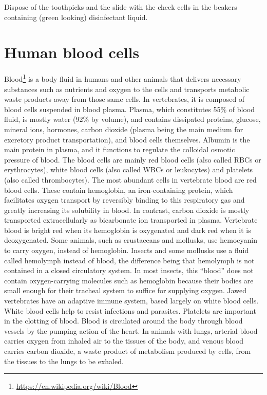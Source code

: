 \documentclass[]{book}
\let\rmarkdownfootnote\footnote%
\def\footnote{\protect\rmarkdownfootnote}
\renewcommand{\href}[2]{#2\footnote{\url{#1}}}
\theoremstyle{definition}
\theoremstyle{definition}
\theoremstyle{definition}
\theoremstyle{remark}
\begin{document}
Dispose of the toothpicks and the slide with the cheek cells in the
beakers containing (green looking) disinfectant liquid.

\section{Human blood cells}\label{human-blood-cells}

\href{https://en.wikipedia.org/wiki/Blood}{Blood} is a body fluid in
humans and other animals that delivers necessary substances such as
nutrients and oxygen to the cells and transports metabolic waste
products away from those same cells. In vertebrates, it is composed of
blood cells suspended in blood plasma. Plasma, which constitutes 55\% of
blood fluid, is mostly water (92\% by volume), and contains dissipated
proteins, glucose, mineral ions, hormones, carbon dioxide (plasma being
the main medium for excretory product transportation), and blood cells
themselves. Albumin is the main protein in plasma, and it functions to
regulate the colloidal osmotic pressure of blood. The blood cells are
mainly red blood cells (also called RBCs or erythrocytes), white blood
cells (also called WBCs or leukocytes) and platelets (also called
thrombocytes). The most abundant cells in vertebrate blood are red blood
cells. These contain hemoglobin, an iron-containing protein, which
facilitates oxygen transport by reversibly binding to this respiratory
gas and greatly increasing its solubility in blood. In contrast, carbon
dioxide is mostly transported extracellularly as bicarbonate ion
transported in plasma. Vertebrate blood is bright red when its
hemoglobin is oxygenated and dark red when it is deoxygenated. Some
animals, such as crustaceans and mollusks, use hemocyanin to carry
oxygen, instead of hemoglobin. Insects and some mollusks use a fluid
called hemolymph instead of blood, the difference being that hemolymph
is not contained in a closed circulatory system. In most insects, this
``blood'' does not contain oxygen-carrying molecules such as hemoglobin
because their bodies are small enough for their tracheal system to
suffice for supplying oxygen. Jawed vertebrates have an adaptive immune
system, based largely on white blood cells. White blood cells help to
resist infections and parasites. Platelets are important in the clotting
of blood. Blood is circulated around the body through blood vessels by
the pumping action of the heart. In animals with lungs, arterial blood
carries oxygen from inhaled air to the tissues of the body, and venous
blood carries carbon dioxide, a waste product of metabolism produced by
cells, from the tissues to the lungs to be exhaled.
\end{document}
